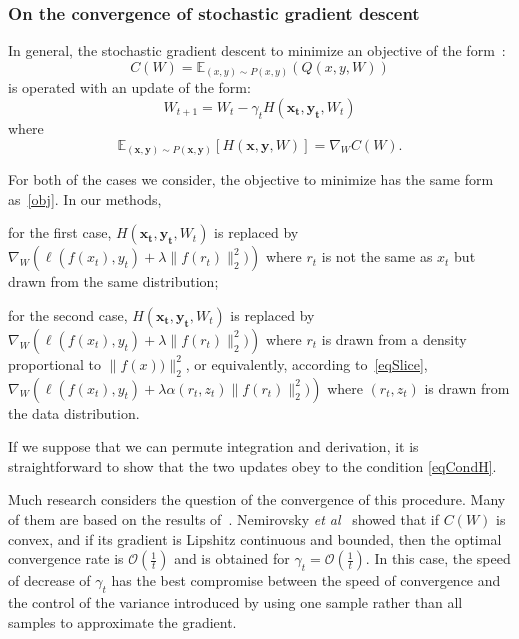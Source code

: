 \documentclass{article}
\begin{document}
\subsubsection{On the convergence of stochastic gradient descent}
In general, the stochastic gradient descent to minimize an objective of the form~\cite{bottou1998online}:
\begin{equation}
C(W) = \mathbb{E}_{(x,y) \sim P(x,y)}(Q(x,y,W))
\label{obj}
\end{equation}
is operated with an update of the form:
\begin{equation}
W_{t+1} = W_t - \gamma_t H(\mathbf{x_t,y_t},W_t)
\end{equation}
where
\begin{equation}
\mathbb{E}_{(\mathbf{x,y}) \sim P(\mathbf{x,y})}[H(\mathbf{x,y},W)] = \nabla_WC(W).
\label{eqCondH}
\end{equation}

For both of the cases we consider, the objective to minimize has the same form as~\eqref{obj}. In our methods,
\begin{inparaenum}[(i)]
\item for the first case, $H(\mathbf{x_t,y_t},W_t)$ is replaced by $\nabla_W \left(\ell(f(x_{t}),y_{t}) + \lambda \| f(r_{t})\|_2^2)\right)$ where $r_t$ is not the same as $x_t$ but drawn from the same distribution; 
\item for the second case, $H(\mathbf{x_t,y_t},W_t)$ is replaced by $\nabla_W \left(\ell(f(x_{t}),y_{t}) + \lambda \| f(r_{t})\|_2^2)\right)$ where $r_t$ is drawn from a density proportional to $\| f(x))\|_2^2$, or equivalently, according to~\eqref{eqSlice}, $\nabla_W \left(\ell(f(x_{t}),y_{t}) + \lambda \alpha(r_t,z_t)\|f(r_{t})\|_2^2)\right)$ where $(r_t,z_t)$ is drawn from the data distribution.
\end{inparaenum}
If we suppose that we can permute integration and derivation, it is straightforward to show that the two updates obey to the condition \eqref{eqCondH}.

Much research considers the question of the convergence of this procedure. Many of them are based on the results of~\cite{robbins1985convergence}. Nemirovsky \textit{et al}~\cite{nemirovski2009robust} showed that if $C(W)$ is convex, and if its gradient is Lipshitz continuous and bounded, then the optimal convergence rate is $\mathcal{O}(\frac{1}{t})$ and is obtained for $\gamma_t = \mathcal{O}(\frac{1}{t})$. In this case, the speed of decrease of $\gamma_t$ has the best compromise between the speed of convergence and the control of the variance introduced by using one sample rather than all samples to approximate the gradient.
\end{document}
